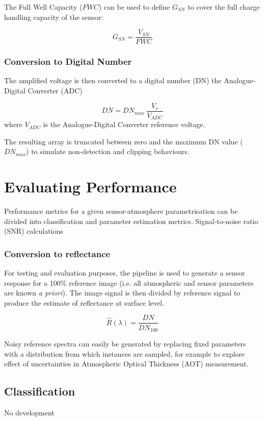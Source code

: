 \documentclass[10pt,a4paper,final,twocolumn]{article}
\begin{document}
The Full Well Capacity ($FWC$) can be used to define $G_{SN}$ to cover the full charge handling capacity of the sensor:

\begin{equation}
G_{SN} = \frac{V_{SN}}{FWC}
\end{equation}

\subsubsection{Conversion to Digital Number}
The amplified voltage is then converted to a digital number (DN) the Analogue-Digital Converter (ADC)

\begin{equation}
DN = DN_{max}~\frac{V_s}{V_{ADC}}
\end{equation}
where $V_{ADC}$  is the Analogue-Digital Converter reference voltage.

The resulting array is truncated between zero and the maximum DN value ($DN_{max}$) to simulate non-detection and clipping behaviours.

\section{Evaluating Performance}
Performance metrics for a given sensor-atmosphere parametrisation can be divided into classification and parameter estimation metrics. Signal-to-noise ratio (SNR) calculations 

\subsubsection{Conversion to reflectance}
For testing and evaluation purposes, the pipeline is used to generate a sensor response for a 100\% reference image (i.e. all atmospheric and sensor parameters are known \textit{a priori}). The image signal is then divided by reference signal to produce the estimate of reflectance at surface level.

\begin{equation}
\widehat{R}(\lambda)= \frac{DN}{DN_{100}}
\end{equation}

Noisy reference spectra can easily be generated by replacing fixed parameters with a distribution from which instances are sampled, for example to explore effect of uncertainties in Atmospheric Optical Thickness (AOT) measurement.


\subsection{Classification}
No development
\end{document}
